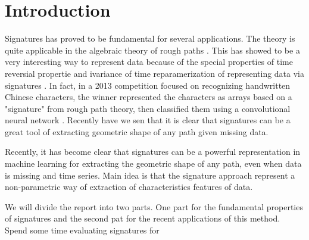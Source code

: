 \section{Introduction}\label{sec:introduction}


Signatures has proved to be fundamental for several applications.
The theory is quite applicable in the algebraic theory of rough paths \cite{geng2021introduction}. This has showed to be a very interesting way to represent data because of the special properties of time reversial propertie and ivariance of time
reparamerization of representing data via signatures \cite{chevyrev2016primer}. In fact, in a
2013 competition focused on recognizing handwritten
Chinese characters, the winner represented the characters as arrays based on a "signature" from rough path theory, then classified them using a convolutional neural network \cite{yin2013icdar}.
Recently have we sen that it is clear that signatures can be a great tool of extracting geometric shape of any path given missing data.

Recently, it has become clear that signatures can be a powerful representation in machine learning for extracting the geometric shape of any path, even when data is missing \cite{chevyrev2016primer} and time series.
 Main idea is that the signature approach represent a non-parametric way of extraction of characteristics features of data.


We will divide the report into two parts. One part for the fundamental properties of signatures and the second pat for the recent applications of this method. Spend some time evaluating signatures for




